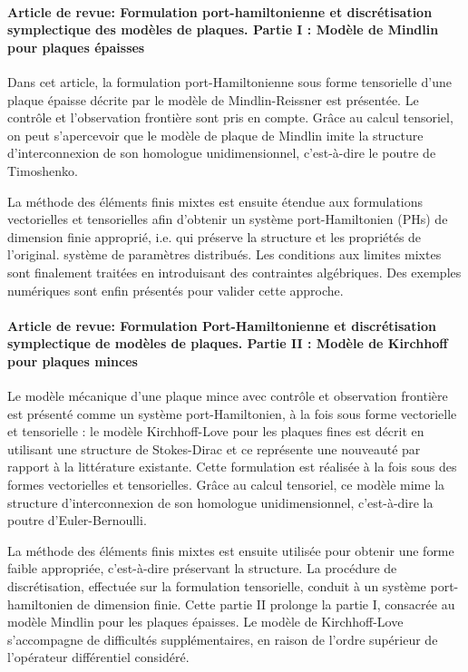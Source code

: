 \documentclass[french]{article}
\begin{document}
\paragraph{Article de revue: Formulation port-hamiltonienne et discrétisation symplectique des modèles de plaques. Partie I : Modèle de Mindlin pour plaques épaisses \cite{brugnoli2019ammmin} \\}

Dans cet article, la formulation port-Hamiltonienne sous forme tensorielle d'une plaque épaisse décrite par le modèle de Mindlin-Reissner est présentée. Le contrôle et l'observation frontière sont pris en compte. Grâce au calcul tensoriel, on peut s'apercevoir que le modèle de plaque de Mindlin imite la structure d'interconnexion de son homologue unidimensionnel, c'est-à-dire le poutre de Timoshenko.

La méthode des éléments finis mixtes est ensuite étendue aux formulations vectorielles et tensorielles afin d'obtenir un système port-Hamiltonien (PHs) de dimension finie approprié, i.e. qui préserve la structure et les propriétés de l'original. système de paramètres distribués. Les conditions aux limites mixtes sont finalement traitées en introduisant des contraintes algébriques. Des exemples numériques sont enfin présentés pour valider cette approche.

\paragraph{Article de revue: Formulation Port-Hamiltonienne et discrétisation symplectique de modèles de plaques. Partie II : Modèle de Kirchhoff pour plaques minces \cite{brugnoli2019ammkir} \\}

Le modèle mécanique d'une plaque mince avec contrôle et observation frontière est présenté comme un système port-Hamiltonien, à la fois sous forme vectorielle et tensorielle : le modèle Kirchhoff-Love pour les plaques fines est décrit en utilisant une structure de Stokes-Dirac et ce représente une nouveauté par rapport à la littérature existante. Cette formulation est réalisée à la fois sous des formes vectorielles et tensorielles. Grâce au calcul tensoriel, ce modèle mime la structure d'interconnexion de son homologue unidimensionnel, c'est-à-dire la poutre d'Euler-Bernoulli.

La méthode des éléments finis mixtes est ensuite utilisée pour obtenir une forme faible appropriée, c'est-à-dire préservant la structure. La procédure de discrétisation, effectuée sur la formulation tensorielle, conduit à un système port-hamiltonien de dimension finie. Cette partie II prolonge la partie I, consacrée au modèle Mindlin pour les plaques épaisses. Le modèle de Kirchhoff-Love s'accompagne de difficultés supplémentaires, en raison de l'ordre supérieur de l'opérateur différentiel considéré.
\end{document}
